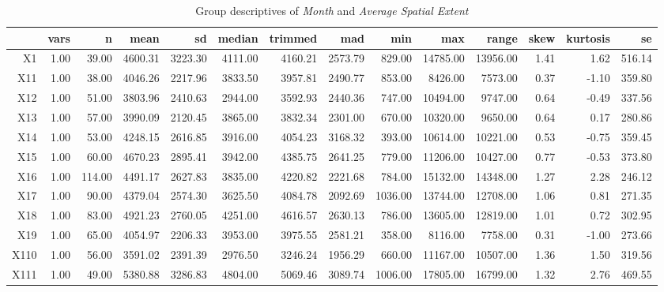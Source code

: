 \begin{table}[ht]
	\tiny
	\centering
	\begin{tabular}{rrrrrrrrrrrrrr}
		\toprule
		& vars & n & mean & sd & median & trimmed & mad & min & max & range & skew & kurtosis & se \\ 
		\midrule
		X1   & 1.00 & 39.00 & 4600.31 & 3223.30 & 4111.00 & 4160.21 & 2573.79 & 829.00 & 14785.00 & 13956.00 & 1.41 & 1.62 & 516.14 \\ 
		X11  & 1.00 & 38.00 & 4046.26 & 2217.96 & 3833.50 & 3957.81 & 2490.77 & 853.00 & 8426.00 & 7573.00 & 0.37 & -1.10 & 359.80 \\ 
		X12  & 1.00 & 51.00 & 3803.96 & 2410.63 & 2944.00 & 3592.93 & 2440.36 & 747.00 & 10494.00 & 9747.00 & 0.64 & -0.49 & 337.56 \\ 
		X13  & 1.00 & 57.00 & 3990.09 & 2120.45 & 3865.00 & 3832.34 & 2301.00 & 670.00 & 10320.00 & 9650.00 & 0.64 & 0.17 & 280.86 \\ 
		X14  & 1.00 & 53.00 & 4248.15 & 2616.85 & 3916.00 & 4054.23 & 3168.32 & 393.00 & 10614.00 & 10221.00 & 0.53 & -0.75 & 359.45 \\ 
		X15  & 1.00 & 60.00 & 4670.23 & 2895.41 & 3942.00 & 4385.75 & 2641.25 & 779.00 & 11206.00 & 10427.00 & 0.77 & -0.53 & 373.80 \\ 
		X16  & 1.00 & 114.00 & 4491.17 & 2627.83 & 3835.00 & 4220.82 & 2221.68 & 784.00 & 15132.00 & 14348.00 & 1.27 & 2.28 & 246.12 \\ 
		X17  & 1.00 & 90.00 & 4379.04 & 2574.30 & 3625.50 & 4084.78 & 2092.69 & 1036.00 & 13744.00 & 12708.00 & 1.06 & 0.81 & 271.35 \\ 
		X18  & 1.00 & 83.00 & 4921.23 & 2760.05 & 4251.00 & 4616.57 & 2630.13 & 786.00 & 13605.00 & 12819.00 & 1.01 & 0.72 & 302.95 \\ 
		X19  & 1.00 & 65.00 & 4054.97 & 2206.33 & 3953.00 & 3975.55 & 2581.21 & 358.00 & 8116.00 & 7758.00 & 0.31 & -1.00 & 273.66 \\ 
		X110 & 1.00 & 56.00 & 3591.02 & 2391.39 & 2976.50 & 3246.24 & 1956.29 & 660.00 & 11167.00 & 10507.00 & 1.36 & 1.50 & 319.56 \\ 
		X111 & 1.00 & 49.00 & 5380.88 & 3286.83 & 4804.00 & 5069.46 & 3089.74 & 1006.00 & 17805.00 & 16799.00 & 1.32 & 2.76 & 469.55 \\ 
		\bottomrule
	\end{tabular}
    \caption{Group descriptives of \textit{Month} and \textit{Average Spatial Extent}}
    \label{tbl:descriptives_baysis_effector_AUrs1_Cov}
\end{table}